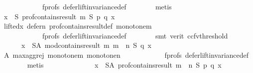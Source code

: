 \begin{isabellebody}
\ \ \ \ \ \ \ \ \ \ \ \ f{\isacharunderscore}{\kern0pt}profs\ defer{\isacharunderscore}{\kern0pt}lift{\isacharunderscore}{\kern0pt}invariance{\isacharunderscore}{\kern0pt}def\isanewline
\ \ \ \ \ \ \isamarkupfalse%
\ metis\isanewline
\ \ \ \ \isamarkupfalse%
\ \isamarkupfalse%
\ {\isachardoublequoteopen}{\isasymforall}x\ {\isasymin}\ S{\isachardot}{\kern0pt}\ prof{\isacharunderscore}{\kern0pt}contains{\isacharunderscore}{\kern0pt}result\ m\ S\ p\ q\ x{\isachardoublequoteclose}\isanewline
\ \ \ \ \ \ \isamarkupfalse%
\ lifted{\isacharunderscore}{\kern0pt}x\ defer{\isacharunderscore}{\kern0pt}n\ prof{\isacharunderscore}{\kern0pt}contains{\isacharunderscore}{\kern0pt}result{\isacharunderscore}{\kern0pt}def\ monotone{\isacharunderscore}{\kern0pt}m\isanewline
\ \ \ \ \ \ \ \ \ \ \ \ f{\isacharunderscore}{\kern0pt}profs\ defer{\isacharunderscore}{\kern0pt}lift{\isacharunderscore}{\kern0pt}invariance{\isacharunderscore}{\kern0pt}def\isanewline
\ \ \ \ \ \ \isamarkupfalse%
\ {\isacharparenleft}{\kern0pt}smt\ {\isacharparenleft}{\kern0pt}verit{\isacharcomma}{\kern0pt}\ ccfv{\isacharunderscore}{\kern0pt}threshold{\isacharparenright}{\kern0pt}{\isacharparenright}{\kern0pt}\isanewline
\ \ \ \ \isamarkupfalse%
\ \isamarkupfalse%
\isanewline
\ \ \ \ \ \ {\isachardoublequoteopen}{\isasymforall}x\ {\isasymin}\ S{\isacharminus}{\kern0pt}A{\isachardot}{\kern0pt}\ mod{\isacharunderscore}{\kern0pt}contains{\isacharunderscore}{\kern0pt}result\ m\ {\isacharparenleft}{\kern0pt}m\ {\isasymparallel}\isactrlsub {\isasymup}\ n{\isacharparenright}{\kern0pt}\ S\ q\ x{\isachardoublequoteclose}\isanewline
\ \ \ \ \ \ \isamarkupfalse%
\ A\ max{\isacharunderscore}{\kern0pt}agg{\isacharunderscore}{\kern0pt}rej{}\ monotone{\isacharunderscore}{\kern0pt}m\ monotone{\isacharunderscore}{\kern0pt}n\isanewline
\ \ \ \ \ \ \ \ \ \ \ \ f{\isacharunderscore}{\kern0pt}profs\ defer{\isacharunderscore}{\kern0pt}lift{\isacharunderscore}{\kern0pt}invariance{\isacharunderscore}{\kern0pt}def\isanewline
\ \ \ \ \ \ \isamarkupfalse%
\ metis\isanewline
\ \ \ \ \isamarkupfalse%
\ \isamarkupfalse%
\ {}{}{\isacharcolon}{\kern0pt}\isanewline
\ \ \ \ \ \ {\isachardoublequoteopen}{\isasymforall}x\ {\isasymin}\ S{\isacharminus}{\kern0pt}A{\isachardot}{\kern0pt}\ prof{\isacharunderscore}{\kern0pt}contains{\isacharunderscore}{\kern0pt}result\ {\isacharparenleft}{\kern0pt}m\ {\isasymparallel}\isactrlsub {\isasymup}\ n{\isacharparenright}{\kern0pt}\ S\ p\ q\ x{\isachardoublequoteclose}\isanewline

\end{isabellebody}
